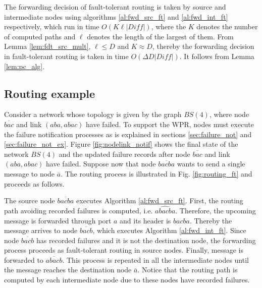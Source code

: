 

\begin{lemma}
\label{lem:fdt_ft}
The forwarding decision of fault-tolerant routing is taken by source and intermediate nodes using algorithms
\ref{al:fwd_src_ft} and \ref{al:fwd_int_ft} respectively, which run in time $O(K\ell|Diff| )$, where the $K$ denotes the number of computed paths and $\ell$ denotes the length of the largest of them. From Lemma \ref{lem:fdt_src_mult}, $\ell\leq D$ and $K\approx D$, thereby the forwarding decision in fault-tolerant routing is taken in time $O(\Delta D|Diff|)$.  It follows from Lemma \ref{lem:pc_alg}.
\end{lemma}

\subsection{Routing example}

Consider a network whose topology is given by the graph $BS(4)$, where node $\overline{bac}$ and link $(aba, abac)$ have failed. To support the WPR, nodes must execute the failure notification processes as is explained in sections \ref{sec:failure_not} and \ref{sec:failure_not_ex}. Figure \ref{fig:nodelink_notif} shows the final state of the network $BS(4)$ and the updated failure records after node $\overline{bac}$ and link $(aba, abac)$
have failed. Suppose now that node $\overline{bacba}$ wants to send a single message to node $\overline{a}$. The routing process is illustrated in Fig. \ref{fig:routing_ft}  and proceeds as follows.

The source node $\overline{bacba}$ executes Algorithm \ref{al:fwd_src_ft}. First, the routing path avoiding recorded failures is computed, i.e. $\widehat{abacba}$. Therefore, the upcoming message is forwarded through port $a$ and its header is $bacba$. 
Thereby the message arrives to node $\overline{bacb}$, which executes Algorithm \ref{al:fwd_int_ft}. Since node $\overline{bacb}$ has recorded failures and it is not the destination node, the forwarding process proceeds as fault-tolerant routing in source nodes. Finally, message is forwarded to $\overline{abacb}$. This process is repeated in all the intermediate nodes until the message reaches the destination node $\overline{a}$. Notice that the routing path is computed by each intermediate node due to these nodes have recorded failures.
